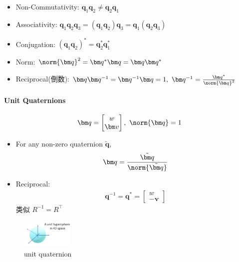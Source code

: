\begin{itemize}
    \item Non-Commutativity: $\bm q_1\bm q_2\ne \bm q_2\bm q_1$
    \item Associativity: $\bm q_1\bm q_2\bm q_3 =( \bm q_1\bm q_2)\bm q_3 = \bm q_1(\bm q_2\bm q_3)$
    \item Conjugation: $(\bm q_1\bm q_2)^*=\bm q_2^*\bm q_1^*$
    \item Norm: $\norm{\bm q}^2=\bm q^*\bm q=\bm q\bm q^*$
    \item Reciprocal(倒数): $\bm q\bm q^{-1}=\bm q^{-1}\bm q =1,\ \bm q^{-1}=\frac{\bm q^*}{\norm{\bm q}^2}$
\end{itemize}



\paragraph{Unit Quaternions}\quad

\begin{align*}
    \bm q=\begin{bmatrix}
        w\\ \bm v
    \end{bmatrix},\ \norm{\bm q}=1
\end{align*}

\begin{itemize}
    \item For any non-zero quaternion $\tilde{\bm q}$,
    \begin{align*}
        \bm q = \frac{\tilde{\bm q}}{\norm{\tilde{\bm q}}}
    \end{align*}
    \item Reciprocal:
    \begin{align*}
        \bm q^{-1}=\bm q^* = \begin{bmatrix}
            w \\ -\bm v
        \end{bmatrix}
    \end{align*}
    类似 $R^{-1}=R^\top$
\end{itemize}

\begin{figure}[!htb]
    \centering
    \includegraphics[width=0.22\textwidth]{pic/1052/unit quaternion}
    \caption{unit quaternion}
\end{figure}


